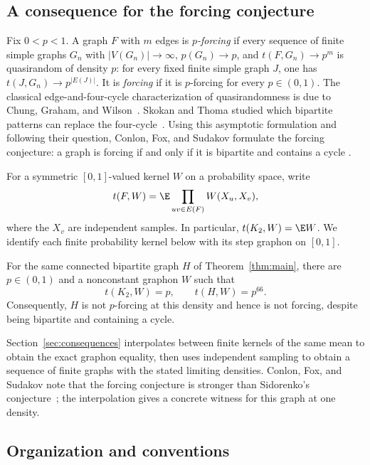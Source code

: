 \subsection*{A consequence for the forcing conjecture}

Fix \(0<p<1\). A graph \(F\) with \(m\) edges is \emph{\(p\)-forcing}
if every sequence of finite simple graphs \(G_n\) with
\(|V(G_n)|\to\infty\), \(p(G_n)\to p\), and
\(t(F,G_n)\to p^m\) is quasirandom of density \(p\): for every fixed
finite simple graph \(J\), one has
\(t(J,G_n)\to p^{|E(J)|}\). It is \emph{forcing} if it is
\(p\)-forcing for every \(p\in(0,1)\). The classical edge-and-four-cycle
characterization of quasirandomness is due to Chung, Graham, and
Wilson~\cite{chunggrahamwilson1989}. Skokan and Thoma studied which
bipartite patterns can replace the four-cycle~\cite{skokanthoma2004}.
Using this asymptotic formulation and following their question,
Conlon, Fox, and Sudakov formulate the forcing conjecture: a graph is forcing if and
only if it is bipartite and contains a cycle
\cite[Section~1, equation~(2) and Conjecture~2]{conlonfoxsudakov2010}.

For a symmetric \([0,1]\)-valued kernel \(W\) on a probability space,
write
\[
t(F,W)=\E\prod_{uv\in E(F)}W(X_u,X_v),
\]
where the \(X_v\) are independent samples. In particular,
\(t(K_2,W)=\E W\). We identify each finite probability kernel below
with its step graphon on \([0,1]\).

\begin{corollary}
\label{cor:forcing}
For the same connected bipartite graph \(H\) of
Theorem~\ref{thm:main}, there are \(p\in(0,1)\) and a nonconstant
graphon \(W\) such that
\[
t(K_2,W)=p,\qquad t(H,W)=p^{66}.
\]
Consequently, \(H\) is not \(p\)-forcing at this density and hence is
not forcing, despite being bipartite and containing a cycle.
\end{corollary}

Section~\ref{sec:consequences} interpolates between finite kernels of
the same mean to obtain the exact graphon equality, then uses independent
sampling to obtain a sequence of finite graphs with the stated limiting
densities.
Conlon, Fox, and Sudakov note that the forcing conjecture is stronger
than Sidorenko's conjecture~\cite[Section~1]{conlonfoxsudakov2010};
the interpolation gives a concrete witness for this graph at one density.

\subsection*{Organization and conventions}

